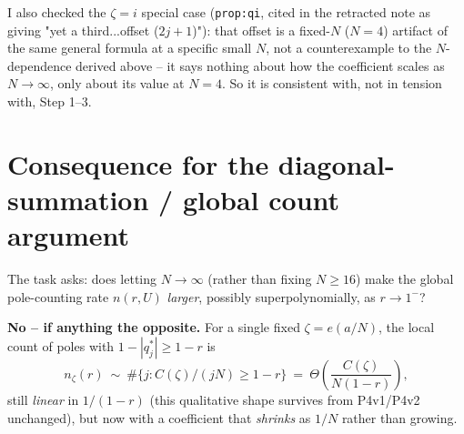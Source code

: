 \documentclass[11pt]{article}
\theoremstyle{remark}
\begin{document}
I also checked the $\zeta=i$ special case (\texttt{prop:qi}, cited in the retracted note as giving
"yet a third...offset ($2j+1$)"): that offset is a fixed-$N$ ($N=4$) artifact of the same general
formula at a specific small $N$, not a counterexample to the $N$-dependence derived above -- it says
nothing about how the coefficient scales as $N\to\infty$, only about its value at $N=4$. So it is
consistent with, not in tension with, Step 1--3.

\section{Consequence for the diagonal-summation / global count argument}

The task asks: does letting $N\to\infty$ (rather than fixing $N\ge16$) make the global
pole-counting rate $n(r,U)$ \emph{larger}, possibly superpolynomially, as $r\to1^-$?

\textbf{No -- if anything the opposite.} For a single fixed $\zeta=e(a/N)$, the local count of poles
with $1-|q^*_j|\ge 1-r$ is
\[n_\zeta(r)\ \sim\ \#\{j: C(\zeta)/(jN)\ge 1-r\}\ =\ \Theta\!\left(\frac{C(\zeta)}{N(1-r)}\right),\]
still \emph{linear} in $1/(1-r)$ (this qualitative shape survives from P4v1/P4v2 unchanged), but now
with a coefficient that \emph{shrinks} as $1/N$ rather than growing.
\end{document}
